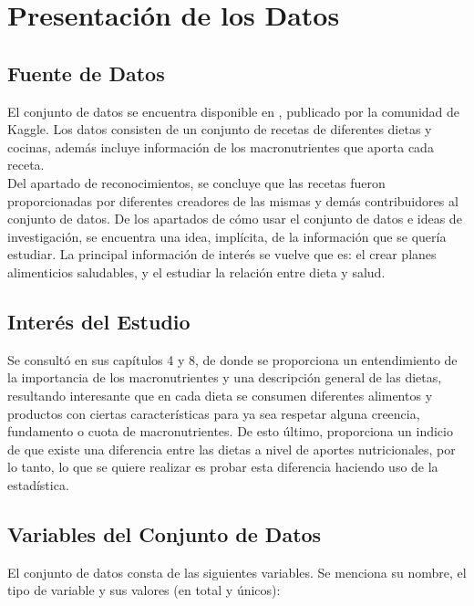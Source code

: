 \documentclass[12pt,a4paper]{article}
\begin{document}
    \newpage
 
    \newpage

    \section{Presentación de los Datos}
    {
        \subsection{Fuente de Datos}
        {
            El conjunto de datos se encuentra disponible en \cite{dataset_macronutrients}, 
            publicado por la comunidad de Kaggle. Los datos consisten de un conjunto 
            de recetas de diferentes dietas y cocinas, además incluye información de los macronutrientes que 
            aporta cada receta.\\
            
            \cite{dataset_macronutrients} Del apartado de reconocimientos, se concluye que las recetas fueron 
            proporcionadas por diferentes creadores de las mismas y demás contribuidores 
            al conjunto de datos. 
            De los apartados de cómo usar el conjunto de datos e ideas de investigación, 
            se encuentra una idea, implícita, de la información que se quería estudiar. 
            La principal información de interés se vuelve que es: el crear planes 
            alimenticios saludables, y el estudiar la relación entre dieta y salud.
        }

        \subsection{Interés del Estudio}
        {
            Se consultó \cite{marvastipopular} en sus 
            capítulos 4 y 8, de donde se proporciona un entendimiento de la 
            importancia de los macronutrientes y una descripción general de las 
            dietas, resultando interesante que en cada dieta se 
            consumen diferentes alimentos y productos con ciertas características 
            para ya sea respetar alguna creencia, fundamento o cuota de macronutrientes. 
            De esto último, proporciona un indicio de que existe una diferencia entre 
            las dietas a nivel de aportes nutricionales, por lo tanto, lo que se 
            quiere realizar es probar esta diferencia haciendo 
            uso de la estadística.
        }

        \subsection{Variables del Conjunto de Datos}
        {
            El conjunto de datos consta de las siguientes variables. Se menciona su 
            nombre, el tipo de variable y sus valores (en total y únicos):
            
}}
\end{document}
